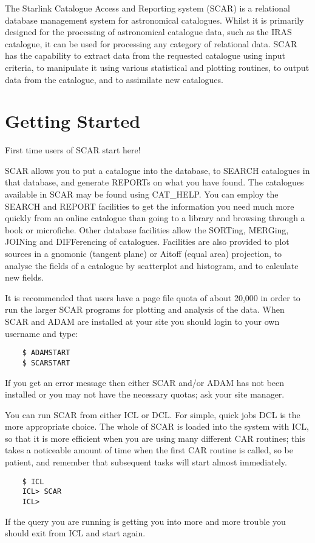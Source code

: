 The Starlink Catalogue Access and Reporting system (SCAR) is a relational
database management system for astronomical catalogues.
Whilst it is primarily designed for the processing of astronomical catalogue
data, such as the IRAS catalogue, it can be used for processing any category of
relational data.
SCAR has the capability to extract data from the requested catalogue using input
criteria, to manipulate it using various statistical and plotting routines,
to output data from the catalogue, and to assimilate new catalogues.


\section {Getting Started}

First time users of SCAR start here!

SCAR allows you to put a catalogue into the database, to SEARCH
catalogues in that database, and generate REPORTs on what you have found.
The catalogues available in SCAR may be found using CAT\_HELP.
You can employ the SEARCH and REPORT facilities to get the information you need
much more quickly from an online catalogue than going to a library and browsing
through a book or microfiche.
Other database facilities allow the SORTing, MERGing, JOINing and DIFFerencing
of catalogues.
Facilities are also provided to plot sources in a gnomonic (tangent plane) or
Aitoff (equal area) projection, to analyse the fields of a catalogue by
scatterplot and histogram, and to calculate new fields.

It is recommended that users have a page file quota of about 20,000 in order
to run the larger SCAR programs for plotting and analysis of the data.
When SCAR and ADAM are installed at your site you should login to your own
username and type:
\begin{verbatim}
    $ ADAMSTART
    $ SCARSTART
\end{verbatim}
If you get an error message then either SCAR  and/or ADAM has not been
installed or you may not have the necessary quotas; ask your site manager.

You can run SCAR from either ICL or DCL.
For simple, quick jobs DCL is the more appropriate choice.
The whole of SCAR is loaded into the system with ICL, so that it is more
efficient when you are using many different CAR routines; this takes a
noticeable amount of time when the first CAR routine is called, so
be patient, and remember that subsequent tasks will start almost immediately.
\begin{verbatim}
    $ ICL
    ICL> SCAR
    ICL>
\end{verbatim}
If the query you are running is getting you into more and more trouble
you should exit from ICL and start again.


